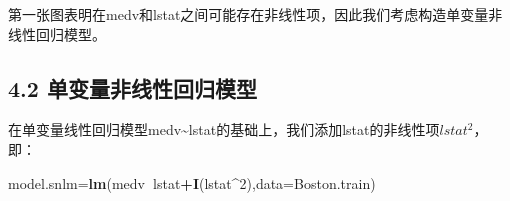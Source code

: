 \documentclass[UTF-8]{ctexart}
\newenvironment{Shaded}{\begin{snugshade}}{\end{snugshade}}
\newcommand{\DataTypeTok}[1]{\textcolor[rgb]{0.13,0.29,0.53}{#1}}
\newcommand{\DecValTok}[1]{\textcolor[rgb]{0.00,0.00,0.81}{#1}}
\newcommand{\KeywordTok}[1]{\textcolor[rgb]{0.13,0.29,0.53}{\textbf{#1}}}
\newcommand{\NormalTok}[1]{#1}
\newcommand{\OperatorTok}[1]{\textcolor[rgb]{0.81,0.36,0.00}{\textbf{#1}}}
\begin{document}
\begin{figure}[H]
	\centering
	\centering
\end{figure}
第一张图表明在medv和lstat之间可能存在非线性项，因此我们考虑构造单变量非线性回归模型。


\subsection{4.2 单变量非线性回归模型}

在单变量线性回归模型medv\textasciitilde lstat的基础上，我们添加lstat的非线性项\(lstat^{2}\)，即：

\begin{Shaded}
	\begin{Highlighting}[]
\NormalTok{model.snlm=}\KeywordTok{lm}\NormalTok{(medv}\OperatorTok{~}\NormalTok{lstat}\OperatorTok{+}\KeywordTok{I}\NormalTok{(lstat}\OperatorTok{^}\DecValTok{2}\NormalTok{),}\DataTypeTok{data=}\NormalTok{Boston.train)}
	\end{Highlighting}
\end{Shaded}
\end{document}
